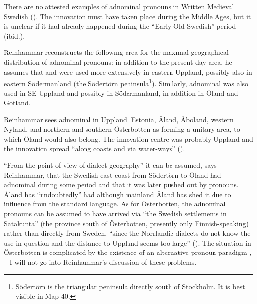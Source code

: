 

There are no attested examples of adnominal pronouns in Written Medieval Swedish (\citet[114]{Reinhammar1975}). The innovation must have taken place during the Middle Ages, but it is unclear if it had already happened during the “Early Old Swedish” period (ibid.).




Reinhammar reconstructs the following area for the maximal geographical distribution of adnominal pronouns: in addition to the present-day area, he assumes that  and  were used more extensively in eastern Uppland, possibly also in eastern Södermanland (the Södertörn peninsula\footnote{ Södertörn is the triangular peninsula directly south of Stockholm. It is best visible in Map 40.}). Similarly, adnominal was also used in SE Uppland and possibly in Södermanland, in addition in Öland and Gotland. 




Reinhammar sees adnominal in Uppland, Estonia, Åland, Åboland, western Nyland, and northern and southern Österbotten as forming a unitary area, to which Öland would also belong. The innovation centre was probably Uppland and the innovation spread “along coasts and via water-ways” (\citet[115]{Reinhammar1975}).




“From the point of view of dialect geography” it can be assumed, says Reinhammar, that the Swedish east coast from Södertörn to Öland had adnominal  during some period and that it was later pushed out by pronouns. Åland has “undoubtedly” had although mainland Åland has shed it due to influence from the standard language. As for Österbotten, the adnominal pronouns can be assumed to have arrived via “the Swedish settlements in Satakunta” (the province south of Österbotten, presently only Finnish-speaking) rather than directly from Sweden, “since the Norrlandic dialects do not know the use in question and the distance to Uppland seems too large” (\citet[116]{Reinhammar1975}). The situation in Österbotten is complicated by the existence of an alternative pronoun paradigm ,  – I will not go into Reinhammar’s discussion of these problems. 




